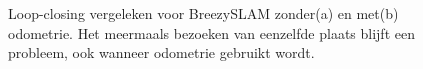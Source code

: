 \begin{figure}
	\centering
	\hspace{0.01\linewidth}
	\caption{Loop-closing vergeleken voor BreezySLAM zonder(a) en met(b) odometrie. Het meermaals bezoeken van eenzelfde plaats blijft een probleem, ook wanneer odometrie gebruikt wordt.} \label{fig:loopclosing2}
\end{figure}

